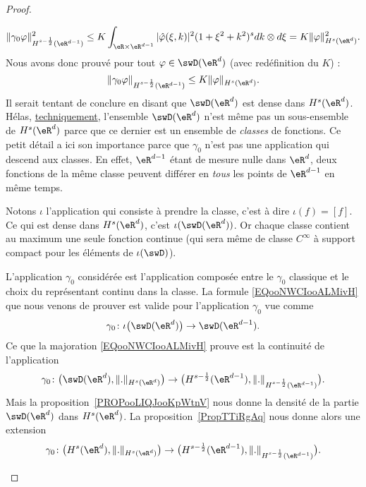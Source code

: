 \begin{proof}
\begin{subproof}
		\begin{equation}
			\| \gamma_0\varphi \|^2_{H^{s-\frac{ 1 }{2}}(\eR^{d-1})}\leq K\int_{\eR\times \eR^{d-1}} |\hat \varphi(\xi,k) |^2(1+\xi^2+k^2)^sdk\otimes d\xi=K\| \varphi \|^2_{H^s(\eR^d)}.
		\end{equation}
		Nous avons donc prouvé pour tout \( \varphi\in\swD(\eR^d)\) (avec redéfinition du \( K\)) :
		\begin{equation}        \label{EQooNWCIooALMivH}
			\| \gamma_0\varphi \|_{H^{s-\frac{ 1 }{2}}(\eR^{d-1})}\leq K\| \varphi \|_{H^s(\eR^d)}.
		\end{equation}
		Il serait tentant de conclure en disant que \( \swD(\eR^d)\) est dense dans \( H^s(\eR^d)\). Hélas, \href{https://explosm.net/comics/3613/}{techniquement}, l'ensemble \( \swD(\eR^d)\) n'est même pas un sous-ensemble de \( H^s(\eR^d)\) parce que ce dernier est un ensemble de \emph{classes} de fonctions. Ce petit détail a ici son importance parce que \( \gamma_0\) n'est pas une application qui descend aux classes. En effet, \( \eR^{d-1}\) étant de mesure nulle dans \( \eR^d\), deux fonctions de la même classe peuvent différer en \emph{tous} les points de \( \eR^{d-1}\) en même temps.

		Notons \( \iota\) l'application qui consiste à prendre la classe, c'est à dire \( \iota(f)=[f]\). Ce qui est dense dans \( H^s(\eR^d)\), c'est \( \iota(\swD(\eR^d))\). Or chaque classe contient au maximum une seule fonction continue (qui sera même de classe \(  C^{\infty}\) à support compact pour les éléments de \( \iota(\swD)\)).

		L'application \( \gamma_0\) considérée est l'application composée entre le \( \gamma_0\) classique et le choix du représentant continu dans la classe. La formule \eqref{EQooNWCIooALMivH} que nous venons de prouver est valide pour l'application \( \gamma_0\) vue comme
		\begin{equation}
			\gamma_0\colon \iota\big( \swD(\eR^d) \big)\to \swD(\eR^{d-1}).
		\end{equation}
		Ce que la majoration \eqref{EQooNWCIooALMivH} prouve est la continuité de l'application
		\begin{equation}
			\gamma_0\colon \big( \swD(\eR^d),\| . \|_{H^s(\eR^d)} \big)\to \big( H^{s-\frac{ 1 }{2}}(\eR^{d-1}),\| . \|_{H^{s-\frac{ 1 }{2}}(\eR^{d-1})} \big).
		\end{equation}
		Mais la proposition~\ref{PROPooLIQJooKpWtnV} nous donne la densité de la partie \( \swD(\eR^d)\) dans \( H^s(\eR^d)\). La proposition~\ref{PropTTiRgAq} nous donne alors une extension
		\begin{equation}
			\gamma_0\colon \big(   H^s(\eR^d), \| . \|_{H^s(\eR^d)}   \big)\to \big( H^{s-\frac{ 1 }{2}}(\eR^{d-1}),\| . \|_{H^{s-\frac{ 1 }{2}}(\eR^{d-1})} \big).
		\end{equation}
	\end{subproof}
\end{proof}

